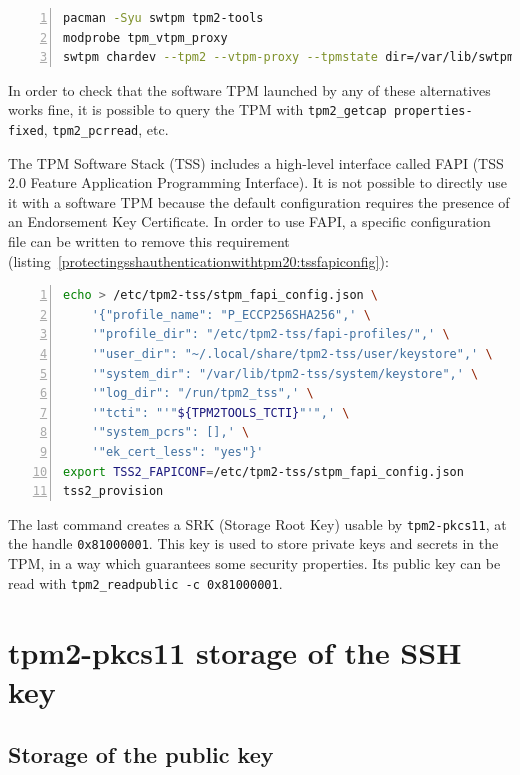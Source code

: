 \begin{lstlisting}[language=sh, numbers=left, caption={Install and launch a TPM 2.0 simulator on Arch Linux, with \texttt{swtpm} and the virtual TPM proxy}, label=protectingsshauthenticationwithtpm20:swtpmvtpmsetup]
pacman -Syu swtpm tpm2-tools
modprobe tpm_vtpm_proxy
swtpm chardev --tpm2 --vtpm-proxy --tpmstate dir=/var/lib/swtpm
\end{lstlisting}

In order to check that the software TPM launched by any of these
alternatives works fine, it is possible to query the TPM with
\texttt{tpm2\_getcap properties-fixed},
\texttt{tpm2\_pcrread}, etc.

The TPM Software Stack (TSS) includes a high-level interface called FAPI
(TSS 2.0 Feature Application Programming Interface). It is not possible
to directly use it with a software TPM because the default configuration
requires the presence of an Endorsement Key Certificate. In order to use
FAPI, a specific configuration file can be written to remove this
requirement
(listing~\ref{protectingsshauthenticationwithtpm20:tssfapiconfig}):

\begin{lstlisting}[language=sh, numbers=left, caption={Configure FAPI with a software TPM 2.0}, label=protectingsshauthenticationwithtpm20:tssfapiconfig]
echo > /etc/tpm2-tss/stpm_fapi_config.json \
    '{"profile_name": "P_ECCP256SHA256",' \
    '"profile_dir": "/etc/tpm2-tss/fapi-profiles/",' \
    '"user_dir": "~/.local/share/tpm2-tss/user/keystore",' \
    '"system_dir": "/var/lib/tpm2-tss/system/keystore",' \
    '"log_dir": "/run/tpm2_tss",' \
    '"tcti": "'"${TPM2TOOLS_TCTI}"'",' \
    '"system_pcrs": [],' \
    '"ek_cert_less": "yes"}'
export TSS2_FAPICONF=/etc/tpm2-tss/stpm_fapi_config.json
tss2_provision
\end{lstlisting}

The last command creates a SRK (Storage Root Key) usable by
\texttt{tpm2-pkcs11}, at the handle
\texttt{0x81000001}. This key is used to store private
keys and secrets in the TPM, in a way which guarantees some security
properties. Its public key can be read with
\texttt{tpm2\_readpublic -c 0x81000001}.

\section{tpm2-pkcs11 storage of the SSH key}

\subsection{Storage of the public key}

